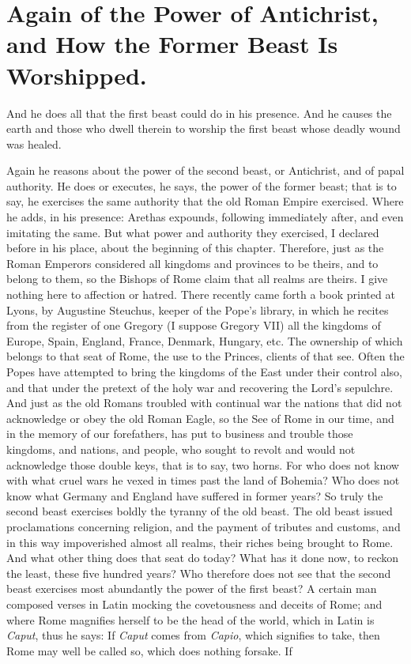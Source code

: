 \chapter[Sermon 59. Again of the Power of Antichrist, and How the Former Beast Is Worshipped.]{Again of the Power of Antichrist, and How the Former Beast Is Worshipped.}
\label{sermon:059}

And he does all that the first beast could do in his presence. And he causes the earth and those who dwell therein to worship the first beast whose deadly wound was healed.

Again he reasons about the power of the second beast, or Antichrist, and of papal authority. He does or executes, he says, the power of the former beast; that is to say, he exercises the same authority that the old Roman Empire exercised. Where he adds, in his presence: Arethas expounds, following immediately after, and even imitating the same. But what power and authority they exercised, I declared before in his place, about the beginning of this chapter. Therefore, just as the Roman Emperors considered all kingdoms and provinces to be theirs, and to belong to them, so the Bishops of Rome claim that all realms are theirs. I give nothing here to affection or hatred. There recently came forth a book printed at Lyons, by Augustine Steuchus, keeper of the Pope’s library, in which he recites from the register of one Gregory (I suppose Gregory VII) all the kingdoms of Europe, Spain, England, France, Denmark, Hungary, etc. The ownership of which belongs to that seat of Rome, the use to the Princes, clients of that see. Often the Popes have attempted to bring the kingdoms of the East under their control also, and that under the pretext of the holy war and recovering the Lord’s sepulchre. And just as the old Romans troubled with continual war the nations that did not acknowledge or obey the old Roman Eagle, so the See of Rome in our time, and in the memory of our forefathers, has put to business and trouble those kingdoms, and nations, and people, who sought to revolt and would not acknowledge those double keys, that is to say, two horns. For who does not know with what cruel wars he vexed in times past the land of Bohemia? Who does not know what Germany and England have suffered in former years? So truly the second beast exercises boldly the tyranny of the old beast. The old beast issued proclamations concerning religion, and the payment of tributes and customs, and in this way impoverished almost all realms, their riches being brought to Rome. And what other thing does that seat do today? What has it done now, to reckon the least, these five hundred years? Who therefore does not see that the second beast exercises most abundantly the power of the first beast? A certain man composed verses in Latin mocking the covetousness and deceits of Rome; and where Rome magnifies herself to be the head of the world, which in Latin is \textit{Caput}, thus he says: If \textit{Caput} comes from \textit{Capio}, which signifies to take, then Rome may well be called so, which does nothing forsake. If 